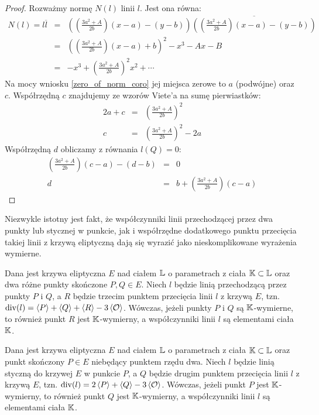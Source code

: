 \begin{proof}
Rozważmy normę $N(l)$ linii $l$. Jest ona równa:
\begin{eqnarray*}
N(l) = l\overline{l}
& = & \left(\left(\frac{3a^2 + A}{2b}\right)(x - a) - (y - b)\right)
      \overline{
      \left(\left(\frac{3a^2 + A}{2b}\right)(x - a) - (y - b)\right)
      } \\
& = & \left(\left(\frac{3a^2+A}{2b}\right)(x-a) + b\right)^2 - x^3 - Ax - B \\
& = & -x^3 + \left(\frac{3a^2+A}{2b}\right)^2x^2 + \cdots
\end{eqnarray*}
Na mocy wniosku \ref{zero_of_norm_coro}
jej miejsca zerowe to $a$ (podwójne) oraz $c$.
Współrzędną $c$ znajdujemy ze wzorów Viete'a na sumę pierwiastków:
\begin{eqnarray*}
2a + c & = & \left(\frac{3a^2+A}{2b}\right)^2 \\
     c & = & \left(\frac{3a^2+A}{2b}\right)^2 - 2a
\end{eqnarray*}
Współrzędną $d$ obliczamy z równania $l(Q) = 0$:
\begin{eqnarray*}
\left(\frac{3a^2 + A}{2b}\right)(c - a) - (d - b) & = & 0 \\
d & = & b + \left(\frac{3a^2 + A}{2b}\right)(c - a)
\end{eqnarray*}
\end{proof}

\noindent
Niezwykle istotny jest fakt,
że współczynniki linii przechodzącej przez dwa punkty
lub stycznej w punkcie,
jak i współrzędne dodatkowego punktu przecięcia
takiej linii z krzywą eliptyczną dają się wyrazić
jako nieskomplikowane wyrażenia wymierne.

\begin{fact}
Dana jest krzywa eliptyczna $E$ nad ciałem $\mathbb{L}$
o parametrach z ciała $\mathbb{K} \subset \mathbb{L}$
oraz dwa różne punkty skończone $P, Q \in E$.
Niech $l$ będzie linią przechodzącą przez punkty $P$ i $Q$,
a $R$ będzie trzecim punktem przecięcia linii $l$ z krzywą $E$,
tzn. $\operatorname{div}(l) = \left\langle P\right\rangle + \left\langle Q\right\rangle + \left\langle R\right\rangle - 3\left\langle\mathcal{O}\right\rangle$.
Wówczas, jeżeli punkty $P$ i $Q$ są $\mathbb{K}$-wymierne,
to również punkt $R$ jest $\mathbb{K}$-wymierny,
a współczynniki linii $l$ są elementami ciała $\mathbb{K}$.
\end{fact}

\begin{fact}
Dana jest krzywa eliptyczna $E$ nad ciałem $\mathbb{L}$
o parametrach z ciała $\mathbb{K} \subset \mathbb{L}$
oraz punkt skończony $P \in E$ niebędący punktem rzędu dwa.
Niech $l$ będzie linią styczną do krzywej $E$ w punkcie $P$,
a $Q$ będzie drugim punktem przecięcia linii $l$ z krzywą $E$,
tzn. $\operatorname{div}(l) = 2\left\langle P\right\rangle + \left\langle Q\right\rangle - 3\left\langle\mathcal{O}\right\rangle$.
Wówczas, jeżeli punkt $P$ jest $\mathbb{K}$-wymierny,
to również punkt $Q$ jest $\mathbb{K}$-wymierny,
a współczynniki linii $l$ są elementami ciała $\mathbb{K}$.
\end{fact}

